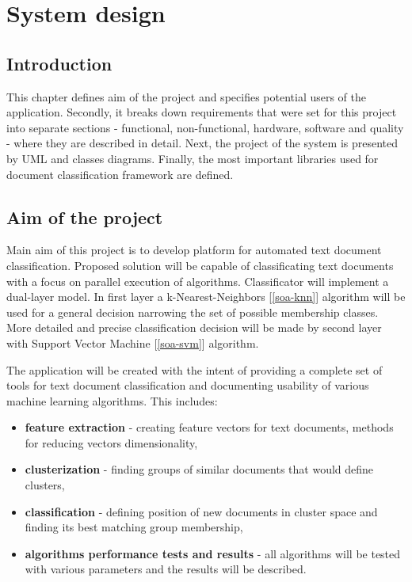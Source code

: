 \chapter{System design} \label{des}
\section{Introduction}
This chapter defines aim of the project and specifies potential users of the application. Secondly, it breaks down requirements that were set for this project into separate sections - functional, non-functional, hardware, software and quality -  where they are described in detail. Next, the project of the system is presented by UML and classes diagrams. Finally, the most important libraries used for document classification framework are defined.

\section{Aim of the project}
Main aim of this project is to develop platform for automated text document classification. Proposed solution will be capable of classificating text documents with a focus on parallel execution of algorithms. Classificator will implement a dual-layer model. In first layer a k-Nearest-Neighbors [\ref{soa-knn}] algorithm will be used for a general decision narrowing the set of possible membership classes. More detailed and precise classification decision will be made by second layer with Support Vector Machine [\ref{soa-svm}] algorithm.

The application will be created with the intent of providing a complete set of tools for text document classification and documenting usability of various machine learning algorithms. This includes:
\begin{itemize}
	\item \textbf{feature extraction} - creating feature vectors for text documents, methods for reducing vectors dimensionality,
	\item \textbf{clusterization} - finding groups of similar documents that would define clusters,
	\item \textbf{classification} - defining position of new documents in cluster space and finding its best matching group membership,
	\item \textbf{algorithms performance tests and results} - all algorithms will be tested with various parameters and the results will be described.
\end{itemize}

